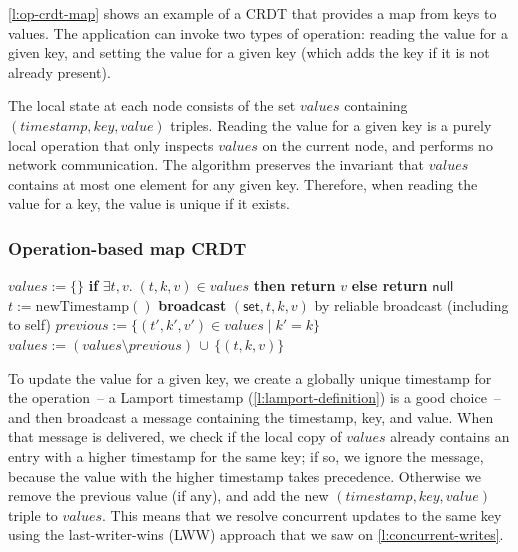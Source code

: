 \autoref{l:op-crdt-map} shows an example of a CRDT that provides a map from keys to values.
The application can invoke two types of operation: reading the value for a given key, and setting the value for a given key (which adds the key if it is not already present).

The local state at each node consists of the set $\mathit{values}$ containing $(\mathit{timestamp}, \mathit{key}, \mathit{value})$ triples.
Reading the value for a given key is a purely local operation that only inspects $\mathit{values}$ on the current node, and performs no network communication.
The algorithm preserves the invariant that $\mathit{values}$ contains at most one element for any given key.
Therefore, when reading the value for a key, the value is unique if it exists.

\begin{frame}
    \label{s:op-crdt-map}
    \frametitle{Operation-based map CRDT}
    \footnotesize
    \begin{algorithmic}
            \State $\mathit{values} := \{\}$
        \EndOn
        \State
            \State \textbf{if} $\exists t,v.\; (t,k,v) \in \mathit{values}$ \textbf{then return} $v$ \textbf{else return} $\mathsf{null}$
        \EndOn
        \State
            \State $t := \mathrm{newTimestamp}()$ 
            \State \textbf{broadcast} $(\mathsf{set}, t, k, v)$ by reliable broadcast (including to self)
        \EndOn
        \State
            \State $\mathit{previous} := \{(t',k',v') \in \mathit{values} \mid k' = k\}$
                \State $\mathit{values} := (\mathit{values} \setminus \mathit{previous}) \,\cup\, \{(t,k,v)\}$
            \EndIf
        \EndOn
    \end{algorithmic}
\end{frame}
\label{l:op-crdt-map}

To update the value for a given key, we create a globally unique timestamp for the operation~-- a Lamport timestamp (\autoref{l:lamport-definition}) is a good choice~-- and then broadcast a message containing the timestamp, key, and value.
When that message is delivered, we check if the local copy of $\mathit{values}$ already contains an entry with a higher timestamp for the same key; if so, we ignore the message, because the value with the higher timestamp takes precedence.
Otherwise we remove the previous value (if any), and add the new $(\mathit{timestamp}, \mathit{key}, \mathit{value})$ triple to $\mathit{values}$.
This means that we resolve concurrent updates to the same key using the last-writer-wins (LWW) approach that we saw on \autoref{l:concurrent-writes}.

